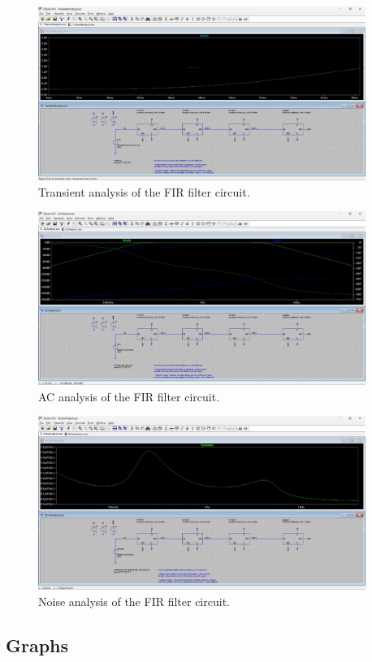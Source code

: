 \documentclass{zc-ust-hw}
\begin{document}
\begin{figure}[H]
  \begin{center}
    \includegraphics[width=0.95\textwidth]{figures/Trans.jpeg}
  \end{center}
  \caption{Transient analysis of the FIR filter circuit.}
\end{figure}

\begin{figure}[H]
  \begin{center}
    \includegraphics[width=0.95\textwidth]{figures/AC.jpeg}
  \end{center}
  \caption{AC analysis of the FIR filter circuit.}
\end{figure}

\begin{figure}[H]
  \begin{center}
    \includegraphics[width=0.95\textwidth]{figures/Noise.jpeg}
  \end{center}
  \caption{Noise analysis of the FIR filter circuit.}
\end{figure}

\subsection{Graphs}

\end{document}
